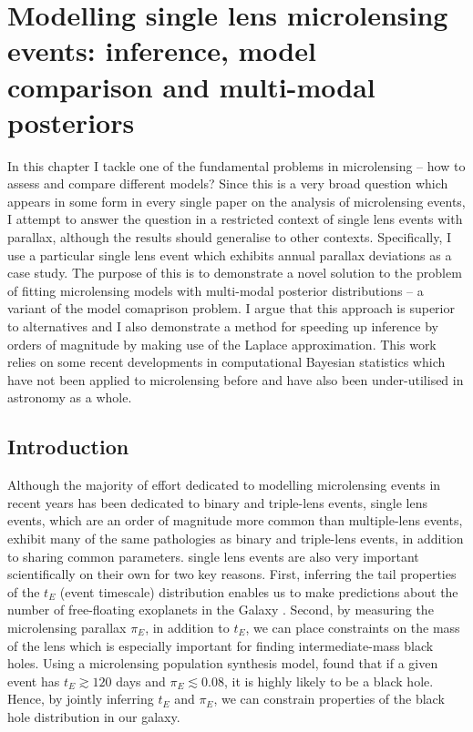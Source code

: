 \documentclass[12pt,dvipsnames]{report}
\begin{document}
\chapter{Modelling single lens microlensing events: inference, model comparison and 
multi-modal posteriors}
\label{ch:single_lens_models}
In this chapter I tackle one of the fundamental problems in microlensing -- how to 
assess and compare different models? Since this is a very broad question which appears
in some form in every single paper on the analysis of microlensing events, I attempt to 
answer the question in a restricted context of single lens events with parallax, although 
the results should generalise to other contexts. Specifically, I use a particular single lens 
event which exhibits annual parallax deviations as a case study. The purpose of this 
is to demonstrate a novel solution to the problem of fitting microlensing models with multi-modal 
posterior distributions -- a variant of the model comaprison problem. 
I argue that this approach is superior to alternatives and 
I also demonstrate a method for speeding up inference by orders of 
magnitude by making use of the Laplace approximation. This work relies on some recent 
developments in computational Bayesian statistics which have not been applied to 
microlensing before and have also been under-utilised in astronomy as a whole.

\section{Introduction}
Although the majority of effort dedicated to modelling microlensing events in recent 
years has been dedicated to binary and triple-lens events, single lens events, which are
an order of magnitude more common than multiple-lens events, exhibit many of the same 
pathologies as binary and triple-lens events, in addition to  
sharing common parameters. single lens events are also very important scientifically 
on their own for two key reasons. First, inferring the tail properties of the $t_E$ (event 
timescale)
distribution enables us to make predictions about the number of free-floating exoplanets
in the Galaxy \citep{sumi_unbound_2011,mroz_no_2017}. Second, by measuring the microlensing 
parallax $\pi_E$, in addition to $t_E$, we can place constraints on the mass of the 
lens \citep{2016MNRAS.458.3012W} which is especially important for finding intermediate-mass 
black holes.  Using a microlensing population synthesis model, \citet{2020ApJ...889...31L} 
found that if a given event has $t_E\gtrsim 120$ days and 
$\pi_E\lesssim 0.08$, it is highly likely to be a black hole. Hence, by jointly inferring 
$t_E$ and $\pi_E$, we can constrain properties of the black hole distribution in our 
galaxy.
\end{document}
